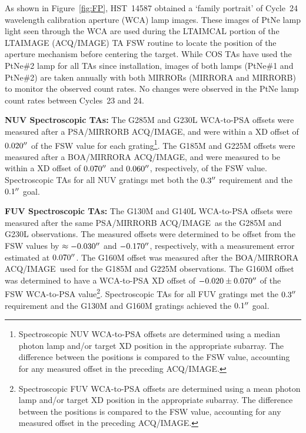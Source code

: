 \documentclass[12pt]{reportj}
\def\arcsec{\hbox{$^{\prime\prime}$}}
\newcommand*{\myfont}{\fontfamily{rm}\selectfont}
\def\acqimage{{\myfont ACQ/IMAGE}\rm}
\begin{document}
\begin{description}
	As shown in Figure~\ref{fig:FP}, HST~14587 obtained a `family portrait' of Cycle~24 wavelength calibration aperture (WCA) lamp images. These images of PtNe lamp light seen through the WCA
	are used during the LTAIMCAL portion of the LTAIMAGE (\acqimage) TA FSW routine to locate the position of the aperture mechanism before centering the target.
	While COS TAs have used the PtNe\#2 lamp for all TAs since installation, images of both lamps (PtNe\#1 and  PtNe\#2) are taken annually with both MIRRORs
	(MIRRORA and  MIRRORB) to monitor the observed count rates. No changes were observed in the PtNe lamp count rates between Cycles~23 and 24.
	\clearpage
\item{\bf NUV Spectroscopic TAs:}
	The G285M and G230L WCA-to-PSA offsets were measured after a PSA/MIRRORB \acqimage, and were within a XD offset of $0.020\arcsec$ of the FSW value for each grating\footnote{Spectroscopic NUV WCA-to-PSA offsets are determined using a median photon lamp and/or target XD position in the appropriate subarray. The difference between the positions is compared to the FSW value, accounting for any measured offset in the preceding \acqimage.}.
	The G185M and G225M offsets were measured after a BOA/MIRRORA \acqimage, and were measured to be within a XD offset of $0.070\arcsec$ and $0.060\arcsec$, respectively, of the FSW value.
	Spectroscopic TAs for all NUV gratings met both the $0.3\arcsec$ requirement and the $0.1\arcsec$ goal.
\item{\bf FUV Spectroscopic TAs:}
	The G130M and G140L WCA-to-PSA offsets were measured after the same PSA/MIRRORB \acqimage~as the G285M and G230L observations.
	The measured offsets were determined to be offset from the FSW values by $\approx -0.030\arcsec$ and $-0.170\arcsec$, respectively, with a measurement error estimated at $0.070\arcsec$.
	The G160M offset was measured after the BOA/MIRRORA \acqimage~used for the G185M and G225M observations. The G160M offset was determined to have a WCA-to-PSA XD offset of $-0.020 \pm 0.070\arcsec$ of the FSW WCA-to-PSA value\footnote{Spectroscopic FUV WCA-to-PSA offsets are determined using a mean photon lamp and/or target XD position in the appropriate subarray. The difference between the positions is compared to the FSW value, accounting for any measured offset in the preceding \acqimage.}.
	Spectroscopic TAs for all FUV gratings met the $0.3\arcsec$ requirement and the G130M and G160M gratings achieved the $0.1\arcsec$ goal.
	\begin{figure}[!h]
	\vspace{1.3cm}

\end{figure}
\end{description}
\end{document}

